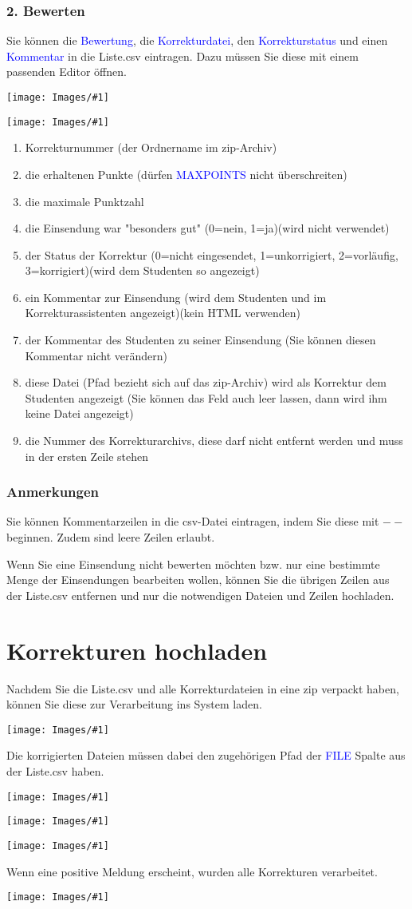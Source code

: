 \documentclass[a4paper,final, parskip]{scrartcl}
\numberwithin{equation}{section}
\newcommand{\blau}[1]{\textcolor{blue}{#1}}
\newenvironment{Bilder}
  {\par\raggedbottom\null\noindent\minipage{\textwidth}\centering}
  {\endminipage\vspace{0.7cm}}
\newcommand{\tbild}[1]{
\begin{Bilder}
 \texttt{[image: Images/\#1]}
	\end{Bilder}
}
\begin{document}
\newpage
\subsubsection*{2. Bewerten}
Sie können die \blau{Bewertung}, die \blau{Korrekturdatei}, den \blau{Korrekturstatus} und einen \blau{Kommentar} in die Liste.csv eintragen. Dazu müssen Sie diese mit einem passenden Editor öffnen. 

\tbild{libreA.png}

\tbild{libreB.png}
\begin{enumerate}
\item Korrekturnummer (der Ordnername im zip-Archiv)
\item die erhaltenen Punkte (dürfen \blau{MAXPOINTS} nicht überschreiten)
\item die maximale Punktzahl
\item die Einsendung war "besonders gut" (0=nein, 1=ja)(wird nicht verwendet)
\item der Status der Korrektur (0=nicht eingesendet, 1=unkorrigiert, 2=vorläufig, 3=korrigiert)(wird dem Studenten so angezeigt)
\item ein Kommentar zur Einsendung (wird dem Studenten und im Korrekturassistenten angezeigt)(kein HTML verwenden)
\item der Kommentar des Studenten zu seiner Einsendung (Sie können diesen Kommentar nicht verändern)
\item diese Datei (Pfad bezieht sich auf das zip-Archiv) wird als Korrektur dem Studenten angezeigt (Sie können das Feld auch leer lassen, dann wird ihm keine Datei angezeigt)
\item die Nummer des Korrekturarchivs, diese darf nicht entfernt werden und muss in der ersten Zeile stehen
\end{enumerate}

\subsubsection*{Anmerkungen}
Sie können Kommentarzeilen in die csv-Datei eintragen, indem Sie diese mit $--$ beginnen. Zudem sind leere Zeilen erlaubt.

Wenn Sie eine Einsendung nicht bewerten möchten bzw. nur eine bestimmte Menge der Einsendungen bearbeiten wollen, können Sie die übrigen Zeilen aus der Liste.csv entfernen und nur die notwendigen Dateien und Zeilen hochladen. 

\newpage
\section{Korrekturen hochladen}
Nachdem Sie die Liste.csv und alle Korrekturdateien in eine zip verpackt haben, können Sie diese zur Verarbeitung ins System laden. 

\tbild{sampleD.png}

Die korrigierten Dateien müssen dabei den zugehörigen Pfad der \blau{FILE} Spalte aus der Liste.csv haben.

\tbild{uploadA.png}
\tbild{uploadB.png}
\tbild{uploadC.png}

Wenn eine positive Meldung erscheint, wurden alle Korrekturen verarbeitet.
\tbild{uploadD.png}
\end{document}
